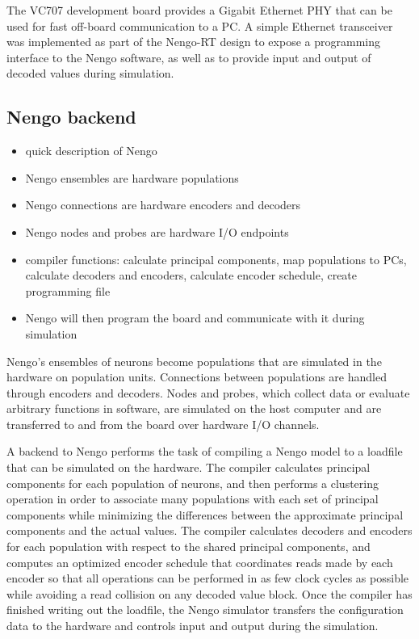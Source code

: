 \documentclass[english]{article}
\begin{document}
The VC707 development board provides a Gigabit Ethernet PHY that can be used for fast off-board communication to a PC.
A simple Ethernet transceiver was implemented as part of the Nengo-RT design to expose a programming interface to the Nengo software,
as well as to provide input and output of decoded values during simulation.


\subsection{Nengo backend}

\begin{itemize}
\item quick description of Nengo
\item Nengo ensembles are hardware populations
\item Nengo connections are hardware encoders and decoders
\item Nengo nodes and probes are hardware I/O endpoints
\item compiler functions: calculate principal components, map populations to PCs, calculate decoders and encoders,
calculate encoder schedule, create programming file
\item Nengo will then program the board and communicate with it during simulation
\end{itemize}

Nengo's ensembles of neurons become populations that are simulated in the hardware on population units.
Connections between populations are handled through encoders and decoders.
Nodes and probes, which collect data or evaluate arbitrary functions in software, are
simulated on the host computer and are transferred to and from the board over hardware 
I/O channels.

A backend to Nengo performs the task of compiling a Nengo model to a loadfile that can be
simulated on the hardware. The compiler calculates principal components for each population
of neurons, and then performs a clustering operation in order to associate many
populations with each set of principal components while minimizing the differences
between the approximate principal components and the actual values.
The compiler calculates decoders and encoders for each population with respect
to the shared principal components, and computes an optimized encoder schedule
that coordinates reads made by each encoder so that all operations can be performed
in as few clock cycles as possible while avoiding a read collision on any decoded value block.
Once the compiler has finished writing out the loadfile, the Nengo simulator
transfers the configuration data to the hardware and controls input and output during the simulation.
\end{document}
